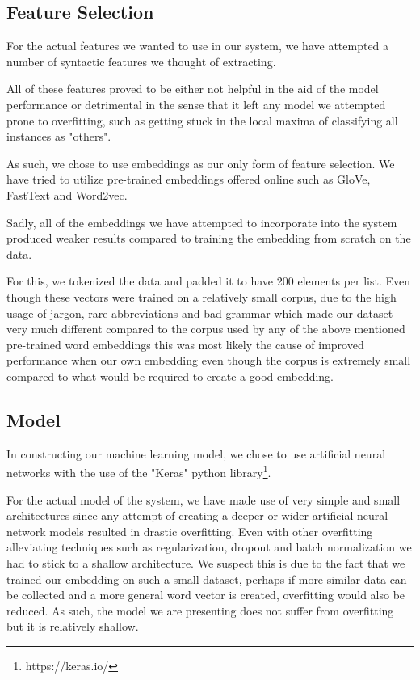 \documentclass[11pt,a4paper]{article}
\begin{document}
\subsection{Feature Selection}

For the actual features we wanted to use in our system, we have attempted a number of syntactic features we thought of extracting. 

All of these features proved to be either not helpful in the aid of the model performance or detrimental in the sense that it left any model we attempted prone to overfitting, such as getting stuck in the local maxima of classifying all instances as "others".

As such, we chose to use embeddings as our only form of feature selection. We have tried to utilize pre-trained embeddings offered online such as GloVe, FastText and Word2vec. 

Sadly, all of the embeddings we have attempted to incorporate into the system produced weaker results compared to training the embedding from scratch on the data.

For this, we tokenized the data and padded it to have 200 elements per list. Even though these vectors were trained on a relatively small corpus, due to the high usage of jargon, rare abbreviations and bad grammar which made our dataset very much different compared to the corpus used by any of the above mentioned pre-trained word embeddings this was most likely the cause of improved performance when our own embedding even though the corpus is extremely small compared to what would be required to create a good embedding. 

\subsection{Model}

In constructing our machine learning model, we chose to use artificial neural networks with the use of the "Keras" python library\footnote{https://keras.io/}.

For the actual model of the system, we have made use of very simple and small architectures since any attempt of creating a deeper or wider artificial neural network models resulted in drastic overfitting. Even with other overfitting alleviating techniques such as regularization, dropout and batch normalization we had to stick to a shallow architecture. We suspect this is due to the fact that we trained our embedding on such a small dataset, perhaps if more similar data can be collected and a more general word vector is created, overfitting would also be reduced. As such, the model we are presenting does not suffer from overfitting but it is relatively shallow. 
\end{document}
